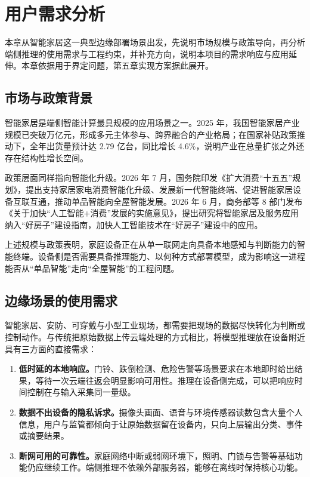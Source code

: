 \section{用户需求分析}
本章从智能家居这一典型边缘部署场景出发，先说明市场规模与政策导向，再分析端侧推理的使用需求与工程约束，并补充\DrivingExtensionDirection{}方向，说明本项目的需求响应与应用延伸。本章依据用于界定问题，第五章实现方案据此展开。

\subsection{市场与政策背景}
智能家居是端侧智能计算最具规模的应用场景之一。2025 年，我国智能家居产业规模已突破万亿元，形成多元主体参与、跨界融合的产业格局；在国家补贴政策推动下，全年出货量预计达 2.79 亿台，同比增长 4.6\%，说明产业在总量扩张之外还存在结构性增长空间。\cite{smarthomescale,smarthomeshipment}

政策层面同样指向智能化升级。2026 年 7 月，国务院印发《扩大消费“十五五”规划》，提出支持家居家电消费智能化升级、发展新一代智能终端、促进智能家居设备互联互通，推动单品智能向全屋智能发展。2026 年 6 月，商务部等 8 部门发布《关于加快“人工智能+消费”发展的实施意见》，提出研究将智能家居及服务应用纳入“好房子”建设指南，加快人工智能技术在“好房子”建设中的应用。\cite{smarthomepolicy,aiconsumptionpolicy}

上述规模与政策表明，家庭设备正在从单一联网走向具备本地感知与判断能力的智能终端。设备侧是否需要具备推理能力、以何种方式部署模型，成为影响这一进程能否从“单品智能”走向“全屋智能”的工程问题。\cite{challenge}

\subsection{边缘场景的使用需求}
智能家居、安防、可穿戴与小型工业现场，都需要把现场的数据尽快转化为判断或控制动作。与传统把原始数据上传云端处理的方式相比，将模型推理放在设备附近具有三方面的直接需求：

\begin{enumerate}
\item \textbf{低时延的本地响应。}门铃、跌倒检测、危险告警等场景要求在本地即时给出结果，等待一次云端往返会明显影响可用性。推理在设备侧完成，可以把响应时间控制在与输入采集同一量级。
\item \textbf{数据不出设备的隐私诉求。}摄像头画面、语音与环境传感器读数包含大量个人信息，用户与监管都倾向于让原始数据留在设备内，只向上层输出分类、事件或摘要结果。
\item \textbf{断网可用的可靠性。}家庭网络中断或弱网环境下，照明、门锁与告警等基础功能仍应继续工作。端侧推理不依赖外部服务器，能够在离线时保持核心功能。
\end{enumerate}

